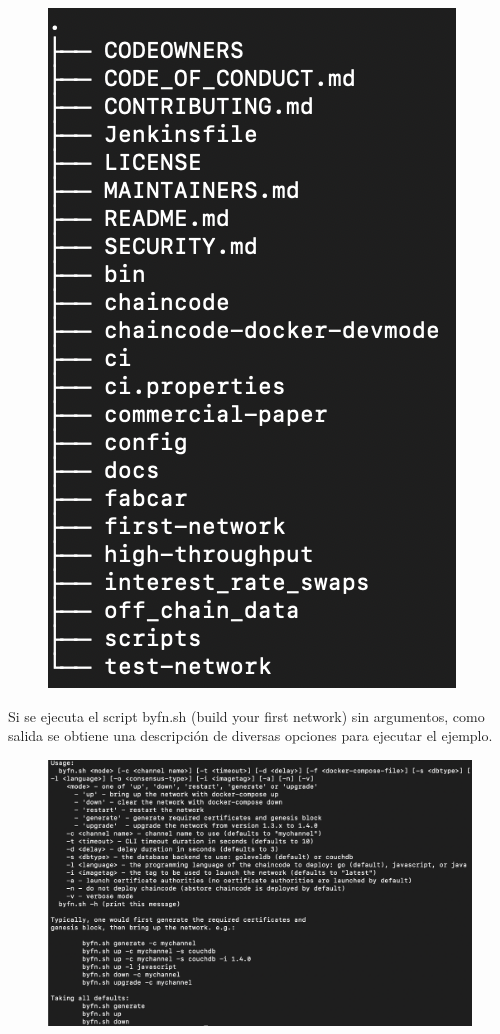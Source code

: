 \documentclass[12pt]{report}
\begin{document}
	\begin{figure}[h]
		\includegraphics[scale=1]{tree-fabric-samples}
		\centering
	\end{figure}
	
	Si se ejecuta el script byfn.sh (build your first network) sin argumentos, como salida se obtiene una descripción de diversas opciones para ejecutar el ejemplo.\\
	
	\begin{figure}[h]
		\includegraphics[scale=0.6]{byfn-script}
		\centering
	\end{figure}
	
\end{document}
